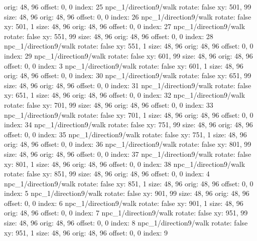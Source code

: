   orig: 48, 96
  offset: 0, 0
  index: 25
npc_1/direction9/walk
  rotate: false
  xy: 501, 99
  size: 48, 96
  orig: 48, 96
  offset: 0, 0
  index: 26
npc_1/direction9/walk
  rotate: false
  xy: 501, 1
  size: 48, 96
  orig: 48, 96
  offset: 0, 0
  index: 27
npc_1/direction9/walk
  rotate: false
  xy: 551, 99
  size: 48, 96
  orig: 48, 96
  offset: 0, 0
  index: 28
npc_1/direction9/walk
  rotate: false
  xy: 551, 1
  size: 48, 96
  orig: 48, 96
  offset: 0, 0
  index: 29
npc_1/direction9/walk
  rotate: false
  xy: 601, 99
  size: 48, 96
  orig: 48, 96
  offset: 0, 0
  index: 3
npc_1/direction9/walk
  rotate: false
  xy: 601, 1
  size: 48, 96
  orig: 48, 96
  offset: 0, 0
  index: 30
npc_1/direction9/walk
  rotate: false
  xy: 651, 99
  size: 48, 96
  orig: 48, 96
  offset: 0, 0
  index: 31
npc_1/direction9/walk
  rotate: false
  xy: 651, 1
  size: 48, 96
  orig: 48, 96
  offset: 0, 0
  index: 32
npc_1/direction9/walk
  rotate: false
  xy: 701, 99
  size: 48, 96
  orig: 48, 96
  offset: 0, 0
  index: 33
npc_1/direction9/walk
  rotate: false
  xy: 701, 1
  size: 48, 96
  orig: 48, 96
  offset: 0, 0
  index: 34
npc_1/direction9/walk
  rotate: false
  xy: 751, 99
  size: 48, 96
  orig: 48, 96
  offset: 0, 0
  index: 35
npc_1/direction9/walk
  rotate: false
  xy: 751, 1
  size: 48, 96
  orig: 48, 96
  offset: 0, 0
  index: 36
npc_1/direction9/walk
  rotate: false
  xy: 801, 99
  size: 48, 96
  orig: 48, 96
  offset: 0, 0
  index: 37
npc_1/direction9/walk
  rotate: false
  xy: 801, 1
  size: 48, 96
  orig: 48, 96
  offset: 0, 0
  index: 38
npc_1/direction9/walk
  rotate: false
  xy: 851, 99
  size: 48, 96
  orig: 48, 96
  offset: 0, 0
  index: 4
npc_1/direction9/walk
  rotate: false
  xy: 851, 1
  size: 48, 96
  orig: 48, 96
  offset: 0, 0
  index: 5
npc_1/direction9/walk
  rotate: false
  xy: 901, 99
  size: 48, 96
  orig: 48, 96
  offset: 0, 0
  index: 6
npc_1/direction9/walk
  rotate: false
  xy: 901, 1
  size: 48, 96
  orig: 48, 96
  offset: 0, 0
  index: 7
npc_1/direction9/walk
  rotate: false
  xy: 951, 99
  size: 48, 96
  orig: 48, 96
  offset: 0, 0
  index: 8
npc_1/direction9/walk
  rotate: false
  xy: 951, 1
  size: 48, 96
  orig: 48, 96
  offset: 0, 0
  index: 9

